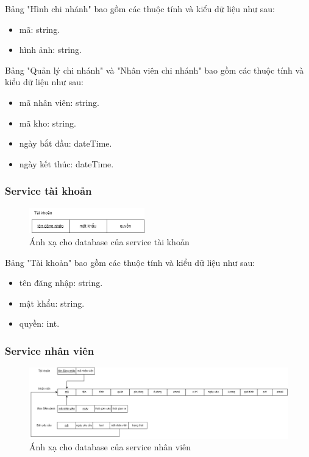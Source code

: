 Bảng "Hình chi nhánh" bao gồm các thuộc tính và kiểu dữ liệu như sau:
\begin{itemize}
	\item mã: string.
	\item hình ảnh: string.
\end{itemize}

Bảng "Quản lý chi nhánh" và "Nhân viên chi nhánh"  bao gồm các thuộc tính và kiểu dữ liệu như sau:
\begin{itemize}
	\item mã nhân viên: string.
	\item mã kho: string.
	\item ngày bắt đầu: dateTime.
	\item ngày kết thúc: dateTime.
\end{itemize}


\subsubsection{Service tài khoản}
\begin{figure}[!htp]
	\begin{center}
		\includegraphics[width=5cm]{img/database/mapping/account.png}
		\newline
		\caption{Ánh xạ cho database của service tài khoản}
	\end{center}
\end{figure}

Bảng "Tài khoản" bao gồm các thuộc tính và kiểu dữ liệu như sau:
\begin{itemize}
	\item tên đăng nhập: string.
	\item mật khẩu: string.
	\item quyền: int.
\end{itemize}


\subsubsection{Service nhân viên}
\begin{figure}[!htp]
	\begin{center}
		\includegraphics[width=1\textwidth]{img/database/mapping/staff.png}
		\newline
		\caption{Ánh xạ cho database của service nhân viên}
	\end{center}
\end{figure}

